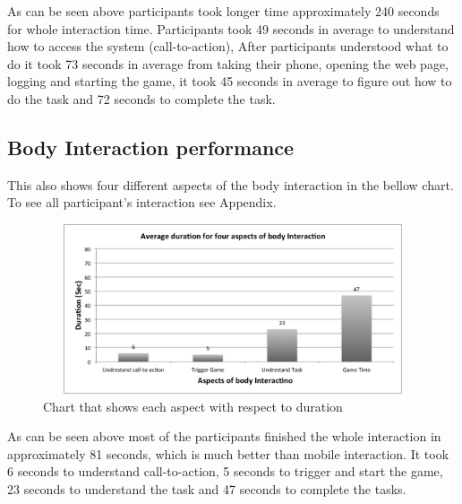 As can be seen above participants took longer time approximately 240 seconds for whole interaction time. Participants took 49 seconds in average to understand how to access the system (call-to-action), After participants understood what to do it took 73 seconds in average from taking their phone, opening the web page, logging and starting the game, it took 45 seconds in average to figure out how to do the task and 72 seconds to complete the task.

%


\subsection{Body Interaction performance}
This also shows four different aspects of the body interaction in the bellow chart. To see all participant's interaction see Appendix. 

\begin{figure}[H]
\centering
\includegraphics[width=12cm,height=5cm]{Figures/6/body_average}%
 \caption{Chart that shows each aspect with respect to duration}%
 \label{fig:body_average}%
\end{figure}

As can be seen above most of the participants finished the whole interaction in approximately 81 seconds, which is much better than mobile interaction. It took 6 seconds to understand call-to-action, 5 seconds to trigger and start the game, 23 seconds to understand the task and 47 seconds to complete the tasks.

